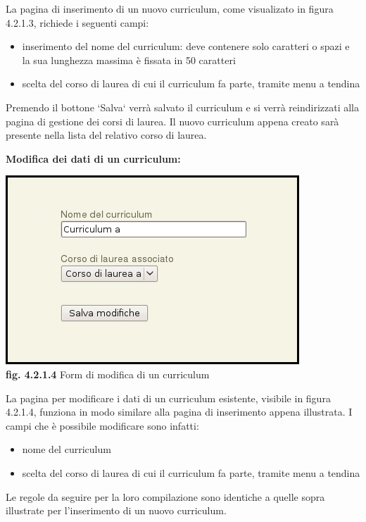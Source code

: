 \documentclass[11pt,a4paper]{article}
\begin{document}
La pagina di inserimento di un nuovo curriculum, come visualizato in figura 4.2.1.3, richiede i seguenti campi:
\begin{itemize}
 \item inserimento del nome del curriculum: deve contenere solo caratteri o spazi e la sua lunghezza massima è fissata in 50 caratteri
 \item scelta del corso di laurea di cui il curriculum fa parte, tramite menu a tendina
\end{itemize}
Premendo il bottone `Salva` verrà salvato il curriculum e si verrà reindirizzati alla pagina di gestione dei corsi di laurea. Il nuovo curriculum appena creato sarà presente nella lista del relativo corso di laurea.
\newline \newline
\begin{large}\textbf{Modifica dei dati di un curriculum:}\end{large}

\begin{center}
	\includegraphics[scale=0.5]{images/modifica_curriculum.jpg}\\
	\textbf{fig. 4.2.1.4} Form di modifica di un curriculum\\
\end{center}

La pagina per modificare i dati di un curriculum esistente, visibile in figura 4.2.1.4, funziona in modo similare alla pagina di inserimento appena illustrata. I campi che è possibile modificare sono infatti:
\begin{itemize}
 \item nome del curriculum
 \item scelta del corso di laurea di cui il curriculum fa parte, tramite menu a tendina
\end{itemize}
Le regole da seguire per la loro compilazione sono identiche a quelle sopra illustrate per l'inserimento di un nuovo curriculum.
\end{document}

